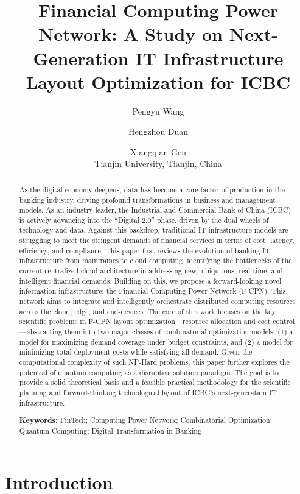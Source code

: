 \documentclass[11pt,a4paper]{article}
\title{\textbf{Financial Computing Power Network: A Study on Next-Generation IT Infrastructure Layout Optimization for ICBC}}
\author{
  Pengyu Wang \and Hengzhou Duan \and Xiangqian Gen \\[4pt]
  \small Tianjin University, Tianjin, China
}
\date{}
\begin{document}
\maketitle

\begin{abstract}
As the digital economy deepens, data has become a core factor of production in the banking industry, driving profound transformations in business and management models. As an industry leader, the Industrial and Commercial Bank of China (ICBC) is actively advancing into the ``Digital 2.0'' phase, driven by the dual wheels of technology and data. Against this backdrop, traditional IT infrastructure models are struggling to meet the stringent demands of financial services in terms of cost, latency, efficiency, and compliance. This paper first reviews the evolution of banking IT infrastructure from mainframes to cloud computing, identifying the bottlenecks of the current centralized cloud architecture in addressing new, ubiquitous, real-time, and intelligent financial demands. Building on this, we propose a forward-looking novel information infrastructure: the Financial Computing Power Network (F-CPN). This network aims to integrate and intelligently orchestrate distributed computing resources across the cloud, edge, and end-devices. The core of this work focuses on the key scientific problems in F-CPN layout optimization---resource allocation and cost control---abstracting them into two major classes of combinatorial optimization models: (1) a model for maximizing demand coverage under budget constraints, and (2) a model for minimizing total deployment costs while satisfying all demand. Given the computational complexity of such NP-Hard problems, this paper further explores the potential of quantum computing as a disruptive solution paradigm. The goal is to provide a solid theoretical basis and a feasible practical methodology for the scientific planning and forward-thinking technological layout of ICBC's next-generation IT infrastructure.

\medskip
\noindent\textbf{Keywords:} FinTech; Computing Power Network; Combinatorial Optimization; Quantum Computing; Digital Transformation in Banking
\end{abstract}

\newpage
\tableofcontents

\newpage

\section{Introduction}
\end{document}
